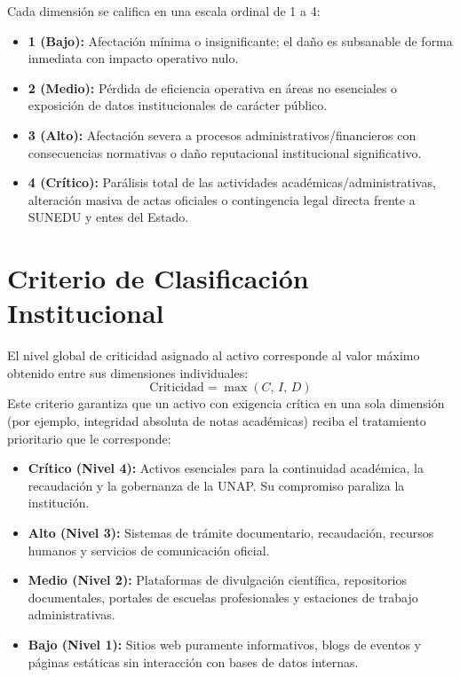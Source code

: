 Cada dimensión se califica en una escala ordinal de 1 a 4:

\begin{itemize}[itemsep=1.5pt,topsep=1pt,parsep=0pt]
    \item \textbf{1 (Bajo):} Afectación mínima o insignificante; el daño es subsanable de forma inmediata con impacto operativo nulo.
    \item \textbf{2 (Medio):} Pérdida de eficiencia operativa en áreas no esenciales o exposición de datos institucionales de carácter público.
    \item \textbf{3 (Alto):} Afectación severa a procesos administrativos/financieros con consecuencias normativas o daño reputacional institucional significativo.
    \item \textbf{4 (Crítico):} Parálisis total de las actividades académicas/administrativas, alteración masiva de actas oficiales o contingencia legal directa frente a SUNEDU y entes del Estado.
\end{itemize}

\section{Criterio de Clasificación Institucional}

El nivel global de criticidad asignado al activo corresponde al valor máximo obtenido entre sus dimensiones individuales:
\[
\text{Criticidad} = \max(C,\, I,\, D)
\]
Este criterio garantiza que un activo con exigencia crítica en una sola dimensión (por ejemplo, integridad absoluta de notas académicas) reciba el tratamiento prioritario que le corresponde:

\begin{itemize}[itemsep=1.5pt,topsep=1pt,parsep=0pt]
    \item \textbf{Crítico (Nivel 4):} Activos esenciales para la continuidad académica, la recaudación y la gobernanza de la UNAP. Su compromiso paraliza la institución.
    \item \textbf{Alto (Nivel 3):} Sistemas de trámite documentario, recaudación, recursos humanos y servicios de comunicación oficial.
    \item \textbf{Medio (Nivel 2):} Plataformas de divulgación científica, repositorios documentales, portales de escuelas profesionales y estaciones de trabajo administrativas.
    \item \textbf{Bajo (Nivel 1):} Sitios web puramente informativos, blogs de eventos y páginas estáticas sin interacción con bases de datos internas.
\end{itemize}

